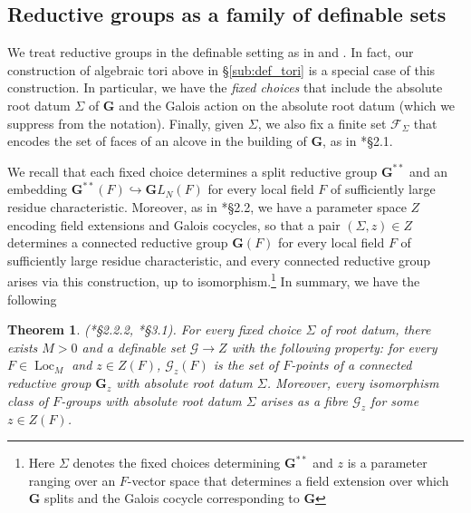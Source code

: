 \documentclass{amsart}
\newcommand{\cF}{\mathcal{F}}
\newcommand{\loc}{\operatorname{Loc}}
\newcommand{\bG}{\mathbf{G}}
\newcommand{\cG}{\mathcal{G}}
\theoremstyle{plain}
\newtheorem{theorem}[thm]{Theorem}
\theoremstyle{definition}
\begin{document}
\subsection{Reductive groups as a family of definable sets}
We treat reductive groups in the definable setting as in \cite{hales:transfert} and \cite{CGH-2}.
In fact, our construction of algebraic tori above in \S \ref{sub:def_tori} is a special case of this construction. 
In particular, we have the \emph{fixed choices} that include the absolute root datum $\Sigma$ of $\bG$
and  the Galois action on the absolute root datum  (which we suppress from the notation). Finally, given $\Sigma$, we also fix a finite set $\cF_\Sigma$ that encodes the set of faces of an alcove in the building of $\bG$, as in \cite{hales:transfert}*{\S 2.1}. %

We recall that each  fixed choice determines  a split reductive group $\bG^{\ast\ast}$ and an embedding 
$\bG^{\ast\ast}(F)\hookrightarrow {\mathbf GL}_N(F)$ for every local field $F$ of sufficiently large residue characteristic.  
Moreover, as in \cite{hales:transfert}*{\S 2.2}, we have a parameter space $Z$ encoding field extensions and Galois cocycles, so that a pair 
$(\Sigma, z)\in Z$ determines a connected reductive group $\bG(F)$ for every local field $F$ of sufficiently
large residue characteristic, and every connected reductive group arises via this construction, up to isomorphism.\footnote{Here
$\Sigma$ denotes the fixed choices determining $\bG^{\ast\ast}$ and $z$ is a parameter ranging over an $F$-vector space that determines a field extension over which $\bG$ splits and the Galois cocycle corresponding to $\bG$} 
In summary, we have the following 
\begin{theorem}\label{thm:def_groups}(\cite{hales:transfert}*{\S 2.2.2}, \cite{CGH-2}*{\S 3.1}). 
 For every fixed choice $\Sigma$ of root datum, there exists $M>0$ and a definable set $\cG \to Z$ with the following property:
for every $F\in \loc_M$ and $z \in Z(F)$, ${\cG_z}(F)$ is the set of $F$-points of a connected reductive group $\bG_z$ with absolute root datum $\Sigma$.  Moreover, every isomorphism class of $F$-groups with absolute root datum 
$\Sigma$ arises as a fibre $\cG_z$ for some $z\in Z(F)$.  
\end{theorem}
\end{document}
